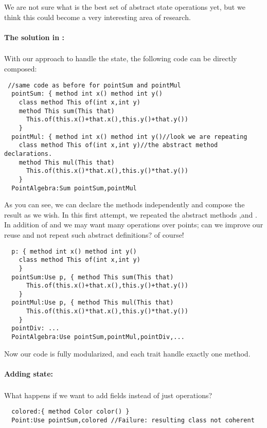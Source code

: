 We are not sure what is the best set of abstract state operations yet, but we think this could become a very interesting area of research.

\paragraph{The solution in \name:}${}_{}$\\
With our approach to handle the state, the following code can be directly composed:

\begin{lstlisting}
 //same code as before for pointSum and pointMul
  pointSum: { method int x() method int y()
    class method This of(int x,int y)
    method This sum(This that)
      This.of(this.x()+that.x(),this.y()+that.y())
    }
  pointMul: { method int x() method int y()//look we are repeating
    class method This of(int x,int y)//the abstract method declarations.
    method This mul(This that)
      This.of(this.x()*that.x(),this.y()*that.y())
    }
  PointAlgebra:Sum pointSum,pointMul
\end{lstlisting}  

  As you can see, we can declare the methods independently and compose the result
  as we wish. In this first attempt, we repeated the abstract methods \Q@x@,\Q@y@ and \Q@of@.
  In addition of \Q@Sum@ and \Q@Mul@ we may want many operations over points; can we improve our reuse
  and not repeat such abstract definitions? of course!

\begin{lstlisting}
  p: { method int x() method int y()
    class method This of(int x,int y)
    }
  pointSum:Use p, { method This sum(This that)
      This.of(this.x()+that.x(),this.y()+that.y())
    }
  pointMul:Use p, { method This mul(This that)
      This.of(this.x()*that.x(),this.y()*that.y())
    }
  pointDiv: ...
  PointAlgebra:Use pointSum,pointMul,pointDiv,...
\end{lstlisting}
      
Now our code is fully modularized, and each trait handle exactly one method.



\paragraph{Adding state:}${}_{}$\\
What happens if we want to add fields instead of just operations?

\begin{lstlisting}
  colored:{ method Color color() }
  Point:Use pointSum,colored //Failure: resulting class not coherent
\end{lstlisting}

